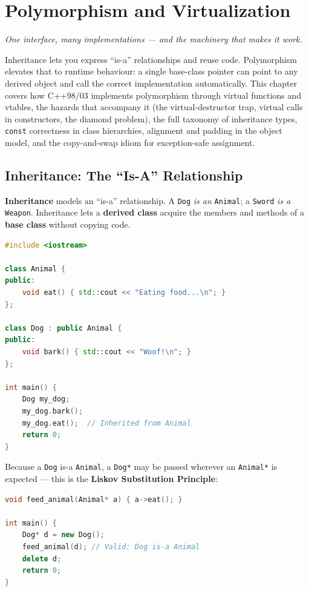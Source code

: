 \chapter{Polymorphism and Virtualization}
\label{ch:polymorphism-virtualization}

\textit{One interface, many implementations --- and the machinery that makes it work.}

Inheritance lets you express ``is-a'' relationships and reuse code. Polymorphism elevates that to runtime behaviour: a single base-class pointer can point to any derived object and call the correct implementation automatically. This chapter covers how C++98/03 implements polymorphism through virtual functions and vtables, the hazards that accompany it (the virtual-destructor trap, virtual calls in constructors, the diamond problem), the full taxonomy of inheritance types, \texttt{const} correctness in class hierarchies, alignment and padding in the object model, and the copy-and-swap idiom for exception-safe assignment.

\section{Inheritance: The ``Is-A'' Relationship}
\label{sec:inheritance-isa}

\textbf{Inheritance} models an ``is-a'' relationship. A \texttt{Dog} \textit{is an} \texttt{Animal}; a \texttt{Sword} \textit{is a} \texttt{Weapon}. Inheritance lets a \textbf{derived class} acquire the members and methods of a \textbf{base class} without copying code.

\begin{lstlisting}[language=C++, caption={Single public inheritance}]
#include <iostream>

class Animal {
public:
    void eat() { std::cout << "Eating food...\n"; }
};

class Dog : public Animal {
public:
    void bark() { std::cout << "Woof!\n"; }
};

int main() {
    Dog my_dog;
    my_dog.bark();
    my_dog.eat();  // Inherited from Animal
    return 0;
}
\end{lstlisting}

Because a \texttt{Dog} is-a \texttt{Animal}, a \texttt{Dog*} may be passed wherever an \texttt{Animal*} is expected --- this is the \textbf{Liskov Substitution Principle}:

\begin{lstlisting}[language=C++, caption={Passing derived as base}]
void feed_animal(Animal* a) { a->eat(); }

int main() {
    Dog* d = new Dog();
    feed_animal(d); // Valid: Dog is-a Animal
    delete d;
    return 0;
}
\end{lstlisting}

